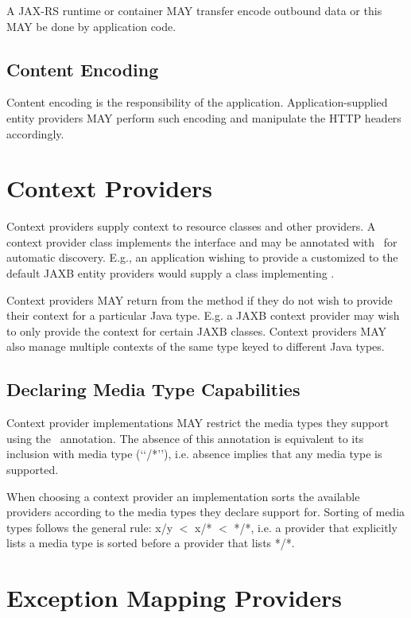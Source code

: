 A JAX-RS runtime or container MAY transfer encode outbound data or this MAY be done by application code.

\subsection{Content Encoding}

Content encoding is the responsibility of the application. Application-supplied entity providers MAY perform such encoding and manipulate the HTTP headers accordingly.

\section{Context Providers}
\label{contextprovider}

Context providers supply context to resource classes and other providers. A context provider class implements the  interface and may be annotated with \Provider\ for automatic discovery. E.g., an application wishing to provide a customized  to the default JAXB entity providers would supply a class implementing .

Context providers MAY return  from the  method if they do not wish to provide their context for a particular Java type. E.g. a JAXB context provider may wish to only provide the context for certain JAXB classes. Context providers MAY also manage multiple contexts of the same type keyed to different Java types.

\subsection{Declaring Media Type Capabilities}
\label{context_media_type}

Context provider implementations MAY restrict the media types they support using the \Produces\ annotation. The absence of this annotation is equivalent to its inclusion with media type (\lq\lq*/*\rq\rq), i.e. absence implies that any media type is supported.

When choosing a context provider an implementation sorts the available providers according to the media types they declare support for. Sorting of media types follows the general rule: x/y $<$ x/* $<$ */*, i.e. a provider that explicitly lists a media type is sorted before a provider that lists */*.

\section{Exception Mapping Providers}
\label{exceptionmapper}

